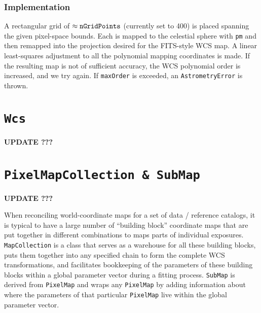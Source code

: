\documentclass[11pt,preprint,flushrt]{aastex}
\begin{document}
\subsubsection{Implementation}
A rectangular grid of $\approx{\tt nGridPoints}$ (currently set to 400) is placed spanning the given pixel-space bounds.  Each is mapped to the celestial sphere with {\tt pm} and then remapped into the projection desired for the FITS-style WCS map.  A linear least-squares adjustment to all the polynomial mapping coordinates is made.  If the resulting map is not of sufficient accuracy, the WCS polynomial order is increased, and we try again.  If {\tt maxOrder} is exceeded, an {\tt AstrometryError} is thrown.

\section{\tt Wcs}
{\bf UPDATE ???}

\section{\tt PixelMapCollection \& SubMap}
{\bf UPDATE ???}

When reconciling world-coordinate maps for a set of data / reference catalogs, it is typical to have a large number of ``building block'' coordinate maps that are put together in different combinations to maps parts of individual exposures.  {\tt MapCollection} is a class that serves as a warehouse for all these building blocks, puts them together into any specified chain to form the complete WCS transformations, and facilitates bookkeeping of the parameters of these building blocks within a global parameter vector during a fitting process.  {\tt SubMap} is derived from {\tt PixelMap} and wraps any {\tt PixelMap} by adding information about where the parameters of that particular {\tt PixelMap} live within the global parameter vector.
\end{document}

